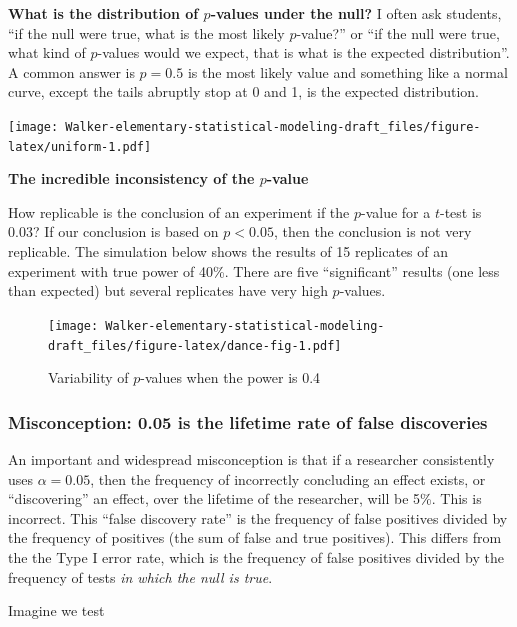 \documentclass[]{book}
\begin{document}
\textbf{What is the distribution of \(p\)-values under the null?} I
often ask students, ``if the null were true, what is the most likely
\(p\)-value?'' or ``if the null were true, what kind of \(p\)-values
would we expect, that is what is the expected distribution''. A common
answer is \(p=0.5\) is the most likely value and something like a normal
curve, except the tails abruptly stop at 0 and 1, is the expected
distribution.

\texttt{[image: Walker-elementary-statistical-modeling-draft\_files/figure-latex/uniform-1.pdf]}

\textbf{The incredible inconsistency of the \(p\)-value}

How replicable is the conclusion of an experiment if the \(p\)-value for
a \(t\)-test is 0.03? If our conclusion is based on \(p < 0.05\), then
the conclusion is not very replicable. The simulation below shows the
results of 15 replicates of an experiment with true power of 40\%. There
are five ``significant'' results (one less than expected) but several
replicates have very high \(p\)-values.

\begin{figure}
\centering
\texttt{[image: Walker-elementary-statistical-modeling-draft\_files/figure-latex/dance-fig-1.pdf]}
\caption{\label{fig:dance-fig}Variability of \(p\)-values when the power is
0.4}
\end{figure}

\subsubsection{Misconception: 0.05 is the lifetime rate of false
discoveries}\label{misconception-0.05-is-the-lifetime-rate-of-false-discoveries}

An important and widespread misconception is that if a researcher
consistently uses \(\alpha=0.05\), then the frequency of incorrectly
concluding an effect exists, or ``discovering'' an effect, over the
lifetime of the researcher, will be 5\%. This is incorrect. This ``false
discovery rate'' is the frequency of false positives divided by the
frequency of positives (the sum of false and true positives). This
differs from the the Type I error rate, which is the frequency of false
positives divided by the frequency of tests \emph{in which the null is
true}.

Imagine we test
\end{document}
